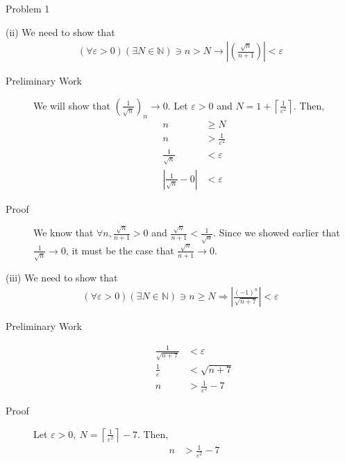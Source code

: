 \documentclass[10pt]{extarticle}
\newcommand{\N}{\mathbb{N}}
\begin{document}
\begin{problem}{Problem 1}
    \begin{problem}{(ii)}
      We need to show that
      \begin{align*}
        (\forall \varepsilon > 0)(\exists N\in \N) \ni n > N \rightarrow \left|\left(\frac{\sqrt{n}}{n + 1}\right)\right| < \varepsilon
      \end{align*}
      \begin{description}
        \item[Preliminary Work] We will show that $\displaystyle\left(\frac{1}{\sqrt{n}}\right)_n\rightarrow 0$. Let $\varepsilon > 0$ and $\displaystyle N = 1 + \left\lceil \frac{1}{\varepsilon^2}\right\rceil$. Then,
          \begin{align*}
            n &\geq N\\
            n &> \frac{1}{\varepsilon^2}\\
            \frac{1}{\sqrt{n}} &< \varepsilon \\
            \left|\frac{1}{\sqrt{n}} - 0\right| &< \varepsilon
          \end{align*}
        \item[Proof] We know that $\forall n, \frac{\sqrt{n}}{n+1} > 0$ and $\frac{\sqrt{n}}{n+1} < \frac{1}{\sqrt{n}}$. Since we showed earlier that $\frac{1}{\sqrt{n}} \rightarrow 0$, it must be the case that $\frac{\sqrt{n}}{n+1} \rightarrow 0$.
      \end{description}
    \end{problem}
    \begin{problem}{(iii)}
      We need to show that
      \begin{align*}
        (\forall \varepsilon > 0)(\exists N \in \N) \ni n \geq N \Rightarrow \left|\frac{(-1)^n}{\sqrt{n+7}}\right| < \varepsilon
      \end{align*}
      \begin{description}
        \item[Preliminary Work]
          \begin{align*}
            \frac{1}{\sqrt{n+7}} &< \varepsilon\\
            \frac{1}{\varepsilon} & < \sqrt{n+7}\\
            n &> \frac{1}{\varepsilon^2} - 7 
          \end{align*}
        \item[Proof] Let $\varepsilon > 0,~\displaystyle N =  \left\lceil\frac{1}{\varepsilon^2}\right\rceil-7$. Then,
          \begin{align*}
            n &> \frac{1}{\varepsilon^2} - 7\\

\end{align*}
\end{description}
\end{problem}
\end{problem}
\end{document}
